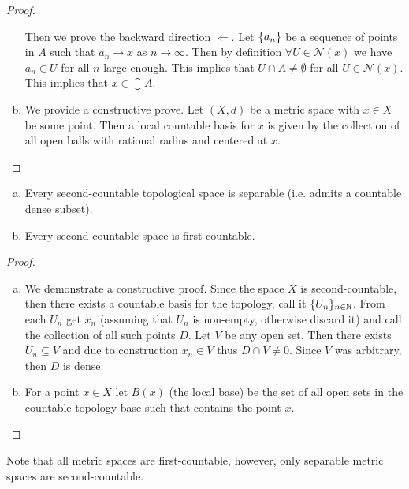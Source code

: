 \begin{proof}
\begin{enumerate}[(a)]
		\noindent Then we prove the backward direction $ \boxed{\Longleftarrow} $. Let $ \{a_n\} $ be a sequence of points in $ A $ such that $ a_n \to x $ as $ n \to \infty $. Then by definition $ \forall U \in \mathcal{N}(x) $ we have $ a_n \in U $ for all $ n $ large enough. This implies that $ U \cap A \neq \emptyset $ for all $ U \in \mathcal{N}(x) $. This implies that $ x \in \closure{A} $.
		
		\item We provide a constructive prove. Let $ (X,d) $ be a metric space with $ x \in X $ be some point. Then a local countable basis for $ x $ is given by the collection of all open balls with rational radius and centered at $ x $.
	\end{enumerate}
\end{proof}


\begin{proposition}
	\begin{enumerate}[(a)]
		\item Every second-countable topological space is separable (i.e. admits a countable dense subset).
		\item Every second-countable space is first-countable.
	\end{enumerate}
\end{proposition}
\begin{proof}
	\begin{enumerate}[(a)]
		\item We demonstrate a constructive proof. Since the space $ X $ is second-countable, then there exists a countable basis for the topology, call it $ \{U_n\}_{n\in\mathbb{N}} $. From each $ U_n $ get $ x_n $ (assuming that $ U_n $ is non-empty, otherwise discard it) and call the collection of all such points $ D $. Let $ V $ be any open set. Then there exists $ U_n \subseteq V $ and due to construction $ x_n \in V $ thus $ D \cap V \neq 0 $. Since $ V $ was arbitrary, then $ D $ is dense.
		
		\item For a point $ x \in X $ let $ B(x) $ (the local base) be the set of all open sets in the countable topology base such that contains the point $ x $. 
	\end{enumerate}
\end{proof}


\begin{remark}
	Note that all metric spaces are first-countable, however, only separable metric spaces are second-countable.
\end{remark}

